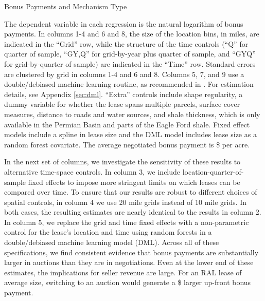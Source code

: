 \addtolength{\tabcolsep}{2pt}
\begin{table}[htpb]
	\begin{center}
	\begin{threeparttable}
	\caption{Bonus Payments and Mechanism Type}
	\label{tab:table_main_bonus}
	\small
	            
	\footnotesize
		\begin{tablenotes}
			\item The dependent variable in each regression is the natural logarithm of bonus payments. In columns 1-4 and 6 and 8, the size of the location bins, in miles, are indicated in the ``Grid'' row, while the structure of the time controls (``Q'' for quarter of sample, ``GY,Q'' for grid-by-year plus quarter of sample, and ``GYQ'' for grid-by-quarter of sample) are indicated in the ``Time'' row.  Standard errors are clustered by grid in columns 1-4 and 6 and 8.  Columns 5, 7, and 9 use a double/debiased machine learning routine, as recommended in \cite{chernozhukov2018double}.  For estimation details, see Appendix \ref{sec:dml}.  ``Extra'' controls include shape regularity, a dummy variable for whether the lease spans multiple parcels, surface cover measures, distance to roads and water sources, and shale thickness, which is only available in the Permian Basin and parts of the Eagle Ford shale.  Fixed effect models include a spline in lease size and the DML model includes lease size as a random forest covariate.  The average negotiated bonus payment is \$ per acre.    
		\end{tablenotes}
	\end{threeparttable}
	\end{center}
\end{table}

In the next set of columns, we investigate the sensitivity of these results to alternative time-space controls. In column 3, we include location-quarter-of-sample fixed effects to impose more stringent limits on which leases can be compared over time.  To ensure that our results are robust to different choices of spatial controls, in column 4 we use 20 mile grids instead of 10 mile grids.  In both cases, the resulting estimates are nearly identical to the results in column 2.  In column 5, we replace the grid and time fixed effects with a non-parametric control for the lease's location and time using random forests in a double/debiased machine learning model (DML). Across all of these specifications, we find consistent evidence that bonus payments are substantially larger in auctions than they are in negotiations. Even at the lower end of these estimates, the implications for seller revenue are large.  For an RAL lease of average size, switching to an auction would generate a \$ larger up-front bonus payment. 

